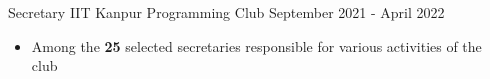 \cventry
{Secretary} %
{IIT Kanpur} %
{Programming Club} %
{September 2021 - April 2022} %
{

  \begin{itemize} %
    \item Among the \textbf{25} selected secretaries responsible for various activities of the club
  \end{itemize}
}

